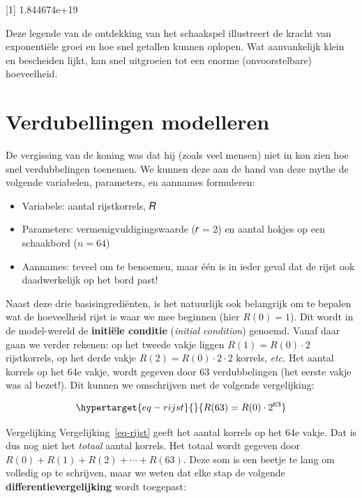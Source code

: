 \documentclass[
  a4paper,
]{scrbook}
\newenvironment{Shaded}{\begin{snugshade}}{\end{snugshade}}
\newcommand{\NormalTok}[1]{\textcolor[rgb]{0.00,0.23,0.31}{#1}}
\providecommand{\tightlist}{%
  \setlength{\itemsep}{0pt}\setlength{\parskip}{0pt}}\usepackage{longtable,booktabs,array}
\theoremstyle{definition}
\theoremstyle{remark}
\begin{document}
\begin{Shaded}
\begin{Highlighting}[]
\NormalTok{[1] 1.844674e+19}
\end{Highlighting}
\end{Shaded}

Deze legende van de ontdekking van het schaakspel illustreert de kracht
van exponentiële groei en hoe snel getallen kunnen oplopen. Wat
aanvankelijk klein en bescheiden lijkt, kan snel uitgroeien tot een
enorme (onvoorstelbare) hoeveelheid.

\hypertarget{verdubellingen-modelleren}{%
\section{Verdubellingen modelleren}\label{verdubellingen-modelleren}}

De vergissing van de koning was dat hij (zoals veel mensen) niet in kon
zien hoe snel verdubbelingen toenemen. We kunnen deze aan de hand van
deze mythe de volgende variabelen, parameters, en aannames formuleren:

\begin{itemize}
\tightlist
\item
  Variabele: aantal rijstkorrels, 𝑅
\item
  Parameters: vermenigvuldigingswaarde (𝑟 = 2) en aantal hokjes op een
  schaakbord (\(n=64\))
\item
  Aannames: teveel om te benoemen, maar één is in ieder geval dat de
  rijst ook daadwerkelijk op het bord past!
\end{itemize}

Naast deze drie basisingrediënten, is het natuurlijk ook belangrijk om
te bepalen wat de hoeveelheid rijst is waar we mee beginnen (hier
\(R(0) = 1\)). Dit wordt in de model-wereld de \textbf{initiële
conditie} (\emph{initial condition}) genoemd. Vanaf daar gaan we verder
rekenen: op het tweede vakje liggen \(R(1) = R(0) \cdot 2\)
rijstkorrels, op het derde vakje \(R(2) = R(0) \cdot 2 \cdot 2\)
korrels, \emph{etc.} Het aantal korrels op het 64e vakje, wordt gegeven
door 63 verdubbelingen (het eerste vakje was al bezet!). Dit kunnen we
omschrijven met de volgende vergelijking:

\begin{equation}\protect\hypertarget{eq-rijst}{}{
R(63) = R(0) \cdot 2^{63}
}\label{eq-rijst}\end{equation}

Vergelijking Vergelijking~\ref{eq-rijst} geeft het aantal korrels op het
64e vakje. Dat is dus nog niet het \emph{totaal} aantal korrels. Het
totaal wordt gegeven door \(R(0) + R(1) + R(2) + \cdots + R(63)\). Deze
som is een beetje te lang om volledig op te schrijven, maar we weten dat
elke stap de volgende \textbf{differentievergelijking} wordt toegepast:
\end{document}
